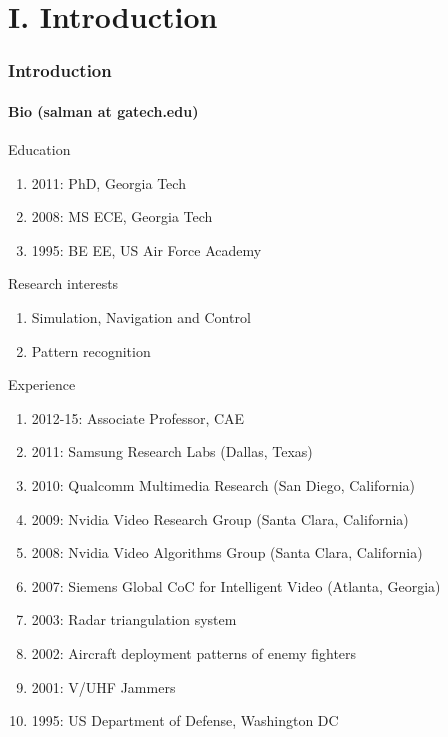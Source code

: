 \section{I. Introduction}
\begin{frame}
\frametitle{Introduction}
\framesubtitle{Bio (salman at gatech.edu)}
\begin{changemargin}{-0.18in}{0in}
\vspace{-0.1in}
{\color{red}Education}
\begin{enumerate}\scriptsize
\item 2011: PhD, Georgia Tech
\item 2008: MS ECE, Georgia Tech
\item 1995: BE EE, US Air Force Academy
\end{enumerate}
{\color{red}Research interests}
\begin{enumerate}\scriptsize
\item Simulation, Navigation and Control
\item Pattern recognition
\end{enumerate}
{\color{red}Experience}
\begin{enumerate}\scriptsize
\item 2012-15: Associate Professor, CAE
\item 2011: Samsung Research Labs (Dallas, Texas)
\item 2010: Qualcomm Multimedia Research (San Diego, California)
\item 2009: Nvidia Video Research Group (Santa Clara, California)
\item 2008: Nvidia Video Algorithms Group (Santa Clara, California)
\item 2007: Siemens Global CoC for Intelligent Video (Atlanta, Georgia)
\item 2003: Radar triangulation system
\item 2002: Aircraft deployment patterns of enemy fighters
\item 2001: V/UHF Jammers
\item 1995: US Department of Defense, Washington DC

\end{enumerate}
\end{changemargin}
\end{frame}


